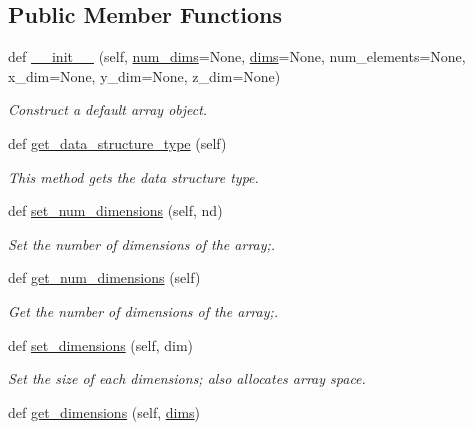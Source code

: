 \subsection*{Public Member Functions}
\begin{DoxyCompactItemize}
\item 
def \mbox{\hyperlink{class_bridges_1_1_array_1_1_array_ad8e23399ea1e3f5bf4cbefdb5d9371be}{\+\_\+\+\_\+init\+\_\+\+\_\+}} (self, \mbox{\hyperlink{class_bridges_1_1_array_1_1_array_a61af14f906e3657866062bef69621445}{num\+\_\+dims}}=None, \mbox{\hyperlink{class_bridges_1_1_array_1_1_array_a309aee1788e19f49aff298155b9b7c39}{dims}}=None, num\+\_\+elements=None, x\+\_\+dim=None, y\+\_\+dim=None, z\+\_\+dim=None)
\begin{DoxyCompactList}\small\item\em Construct a default array object. \end{DoxyCompactList}\item 
def \mbox{\hyperlink{class_bridges_1_1_array_1_1_array_a214847a9e90416f2ae0e14a02aa6376f}{get\+\_\+data\+\_\+structure\+\_\+type}} (self)
\begin{DoxyCompactList}\small\item\em This method gets the data structure type. \end{DoxyCompactList}\item 
def \mbox{\hyperlink{class_bridges_1_1_array_1_1_array_ab85706a4fe954ec7620cd19d076a60d1}{set\+\_\+num\+\_\+dimensions}} (self, nd)
\begin{DoxyCompactList}\small\item\em Set the number of dimensions of the array;. \end{DoxyCompactList}\item 
def \mbox{\hyperlink{class_bridges_1_1_array_1_1_array_afa88ea678d74409768912cbb4026b65e}{get\+\_\+num\+\_\+dimensions}} (self)
\begin{DoxyCompactList}\small\item\em Get the number of dimensions of the array;. \end{DoxyCompactList}\item 
def \mbox{\hyperlink{class_bridges_1_1_array_1_1_array_a496265932c2d4eeefd3605210afb93f9}{set\+\_\+dimensions}} (self, dim)
\begin{DoxyCompactList}\small\item\em Set the size of each dimensions; also allocates array space. \end{DoxyCompactList}\item 
def \mbox{\hyperlink{class_bridges_1_1_array_1_1_array_a7ad57c2bd46d18fbff99dd19cd88ba68}{get\+\_\+dimensions}} (self, \mbox{\hyperlink{class_bridges_1_1_array_1_1_array_a309aee1788e19f49aff298155b9b7c39}{dims}})

\end{DoxyCompactItemize}
